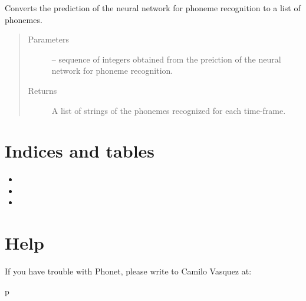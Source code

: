 \documentclass[letterpaper,10pt,english]{sphinxmanual}
\begin{document}
\begin{fulllineitems}
\begin{fulllineitems}
\begin{quote}
\begin{description}
\end{description}\end{quote}

\end{fulllineitems}


\begin{fulllineitems}
\label{\detokenize{index:phonet.Phonet.number2phoneme}}
Converts the prediction of the neural network for phoneme recognition to a list of phonemes.
\begin{quote}\begin{description}
\item[{Parameters}] \leavevmode
{} -- sequence of integers obtained from the preiction of the neural network for phoneme recognition.

\item[{Returns}] \leavevmode
A list of strings of the phonemes recognized for each time-frame.

\end{description}\end{quote}

\end{fulllineitems}


\end{fulllineitems}



\chapter{Indices and tables}
\label{\detokenize{index:indices-and-tables}}\begin{itemize}
\item {} 

\item {} 

\item {} 

\end{itemize}


\chapter{Help}
\label{\detokenize{index:help}}
If you have trouble with Phonet, please write to Camilo Vasquez at: 


\renewcommand{\indexname}{Python Module Index}
\begin{sphinxtheindex}
\def\bigletter#1{{\Large\sffamily#1}\nopagebreak\vspace{1mm}}
\bigletter{p}
\item {}
\end{sphinxtheindex}

\renewcommand{\indexname}{Index}
\printindex
\end{document}

